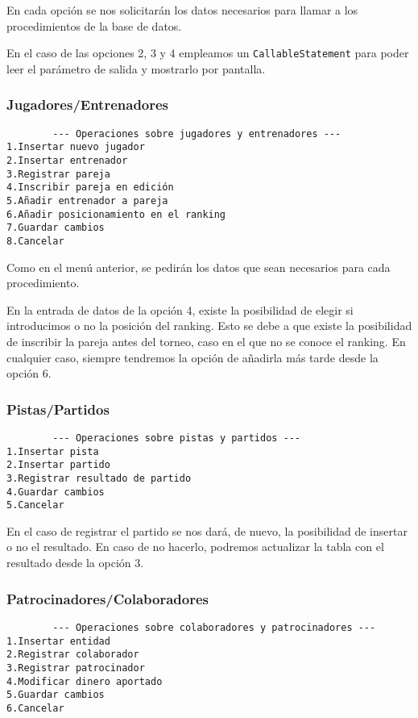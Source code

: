 En cada opción se nos solicitarán los datos necesarios para llamar a los
procedimientos de la base de datos.

En el caso de las opciones 2, 3 y 4 empleamos un \texttt{CallableStatement}
para poder leer el parámetro de salida y mostrarlo por pantalla.

\pagebreak

\subsubsection{Jugadores/Entrenadores}
\begin{lstlisting}
		--- Operaciones sobre jugadores y entrenadores ---
1.Insertar nuevo jugador
2.Insertar entrenador
3.Registrar pareja
4.Inscribir pareja en edición
5.Añadir entrenador a pareja
6.Añadir posicionamiento en el ranking
7.Guardar cambios
8.Cancelar
\end{lstlisting}

Como en el menú anterior, se pedirán los datos que sean necesarios para cada
procedimiento.

En la entrada de datos de la opción 4, existe la posibilidad de elegir si
introducimos o no la posición del ranking. Esto se debe a que existe la posibilidad
de inscribir la pareja antes del torneo, caso en el que no se conoce el ranking.
En cualquier caso, siempre tendremos la opción de añadirla más tarde desde la
opción 6.

\subsubsection{Pistas/Partidos}
\begin{lstlisting}
		--- Operaciones sobre pistas y partidos ---
1.Insertar pista
2.Insertar partido
3.Registrar resultado de partido
4.Guardar cambios
5.Cancelar
\end{lstlisting}

En el caso de registrar el partido se nos dará, de nuevo, la posibilidad de
insertar o no el resultado. En caso de no hacerlo, podremos actualizar la tabla
con el resultado desde la opción 3.

\subsubsection{Patrocinadores/Colaboradores}
\begin{lstlisting}
		--- Operaciones sobre colaboradores y patrocinadores ---
1.Insertar entidad
2.Registrar colaborador
3.Registrar patrocinador
4.Modificar dinero aportado
5.Guardar cambios
6.Cancelar
\end{lstlisting}

